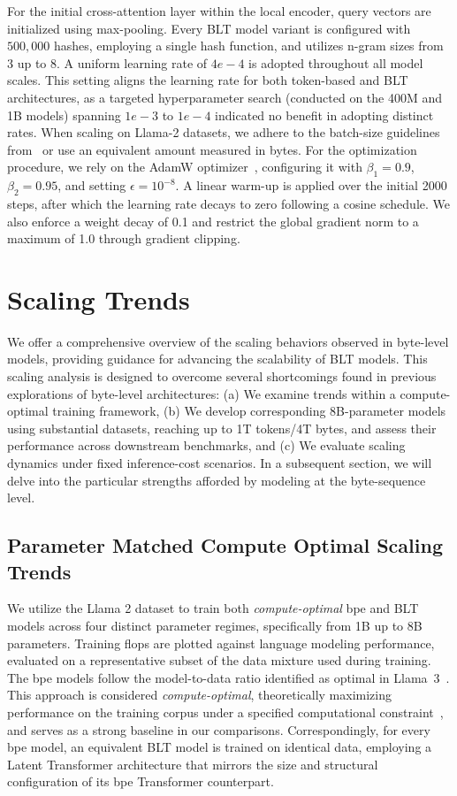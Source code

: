 For the initial cross-attention layer within the local encoder, query vectors are initialized using max-pooling. Every {\textsc BLT} model variant is configured with $500,000$ hashes, employing a single hash function, and utilizes n-gram sizes from 3 up to 8. A uniform learning rate of $4e-4$ is adopted throughout all model scales. This setting aligns the learning rate for both token-based and {\textsc BLT} architectures, as a targeted hyperparameter search (conducted on the 400M and 1B models) spanning $1e-3$ to $1e-4$ indicated no benefit in adopting distinct rates. When scaling on Llama-2 datasets, we adhere to the batch-size guidelines from~\cite{dubey2024llama} or use an equivalent amount measured in bytes. For the optimization procedure, we rely on the AdamW optimizer~\citep{adamw}, configuring it with $\beta_1=0.9$, $\beta_2=0.95$, and setting $\epsilon=10^{-8}$. A linear warm-up is applied over the initial 2000 steps, after which the learning rate decays to zero following a cosine schedule. We also enforce a weight decay of 0.1 and restrict the global gradient norm to a maximum of 1.0 through gradient clipping.

\section{Scaling Trends}
\label{section:scaling}

We offer a comprehensive overview of the scaling behaviors observed in byte-level models, providing guidance for advancing the scalability of {\textsc BLT} models. This scaling analysis is designed to overcome several shortcomings found in previous explorations of byte-level architectures: (a) We examine trends within a compute-optimal training framework, (b) We develop corresponding 8B-parameter models using substantial datasets, reaching up to 1T tokens/4T bytes, and assess their performance across downstream benchmarks, and (c) We evaluate scaling dynamics under fixed inference-cost scenarios. In a subsequent section, we will delve into the particular strengths afforded by modeling at the byte-sequence level.

\subsection{Parameter Matched Compute Optimal Scaling Trends}
\label{section:parameter-matched-scaling}
We utilize the Llama 2 dataset to train both \textit{compute-optimal} bpe and {\textsc BLT} models across four distinct parameter regimes, specifically from 1B up to 8B parameters. Training flops are plotted against language modeling performance, evaluated on a representative subset of the data mixture used during training. The bpe models follow the model-to-data ratio identified as optimal in Llama~3~\citep{dubey2024llama}. This approach is considered \textit{compute-optimal}, theoretically maximizing performance on the training corpus under a specified computational constraint~\citep{hoffmann2022training}, and serves as a strong baseline in our comparisons. Correspondingly, for every bpe model, an equivalent {\textsc BLT} model is trained on identical data, employing a Latent Transformer architecture that mirrors the size and structural configuration of its bpe Transformer counterpart.

